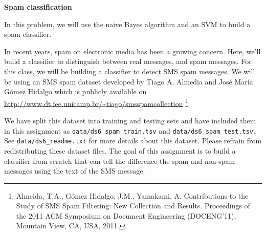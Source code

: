 \newpage
\item {} {\bf Spam classification}

In this problem, we will use the naive Bayes algorithm and an SVM to 
build a spam classifier.  

In recent years, spam on electronic media has been a growing concern.  Here, we'll build a classifier to distinguish
between real messages, and spam messages. For this class, we will be building a classifier to detect SMS spam messages. We will be using an SMS spam dataset developed by Tiago A. Almedia and José María Gómez Hidalgo which is publicly available on \url{http://www.dt.fee.unicamp.br/~tiago/smsspamcollection} \footnote{Almeida, T.A., Gómez Hidalgo, J.M., Yamakami, A. Contributions to the Study of SMS Spam Filtering: New Collection and Results.  Proceedings of the 2011 ACM Symposium on Document Engineering (DOCENG'11), Mountain View, CA, USA, 2011.}

We have split this dataset into training and testing sets and have included them in this assignment as \texttt{data/ds6\_spam\_train.tsv} and \texttt{data/ds6\_spam\_test.tsv}. See \texttt{data/ds6\_readme.txt} for more details about this dataset. Please refrain from redistributing these dataset files. The goal of this assignment is to build a classifier from scratch that can tell the difference the spam and non-spam messages using the text of the SMS message.

\begin{enumerate}
  
  
  

  

  
 
  
  
\end{enumerate}
